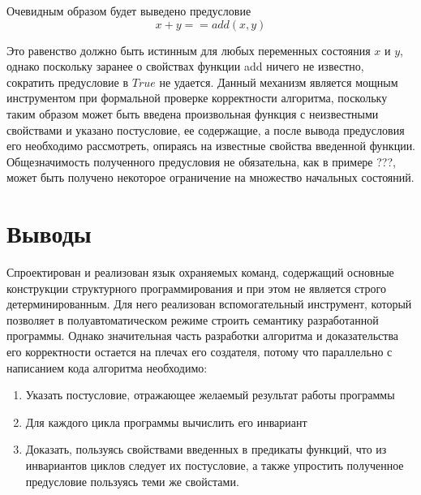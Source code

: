 Очевидным образом будет выведено предусловие 
\begin{equation}
    x + y == add(x, y)
\end{equation}

Это равенство должно быть истинным для любых переменных состояния $x$ и $y$, однако поскольку заранее о свойствах функции
add ничего не известно, сократить предусловие в $True$ не удается. Данный механизм является мощным инструментом при 
формальной проверке корректности алгоритма, поскольку таким образом может быть введена произвольная функция
с неизвестными свойствами и указано постусловие, ее содержащие, а после вывода предусловия его необходимо рассмотреть,
опираясь на известные свойства введенной функции. Общезначимость полученного предусловия не обязательна, как в примере ???,
может быть получено некоторое ограничение на множество начальных состояний.


\section{Выводы} \label{ch3:conclusion}
Спроектирован и реализован язык охраняемых команд, содержащий основные конструкции структурного программирования
и при этом не является строго детерминированным. Для него реализован вспомогательный инструмент,
который позволяет в полуавтоматическом режиме строить семантику разработанной программы. Однако значительная часть
разработки алгоритма и доказательства его корректности остается на плечах его создателя, 
потому что параллельно с написанием кода алгоритма необходимо:
\begin{enumerate}
    \item Указать постусловие, отражающее желаемый результат работы программы
    \item Для каждого цикла программы вычислить его инвариант
    \item Доказать, пользуясь свойствами введенных в предикаты функций, что из инвариантов циклов 
    следует их постусловие, а также упростить полученное предусловие пользуясь теми же свойстами.
\end{enumerate}